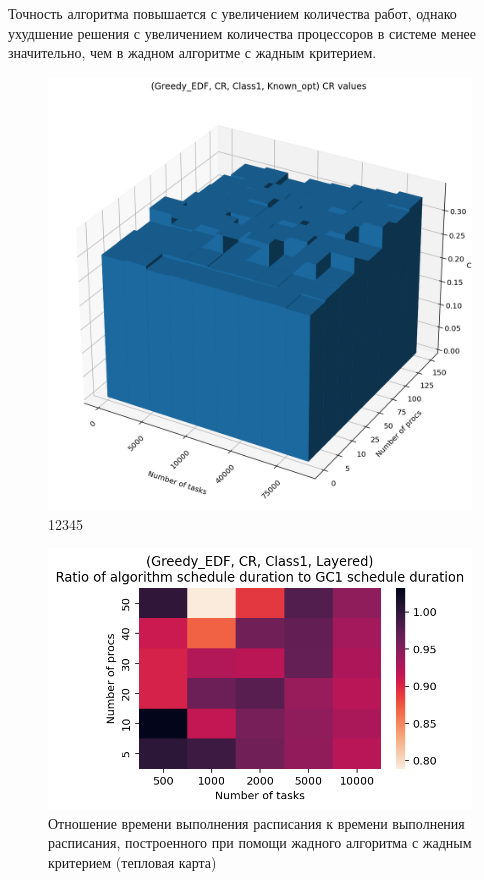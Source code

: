 Точность алгоритма повышается с увеличением количества работ, однако ухудшение решения с увеличением количества процессоров в системе менее значительно, чем в жадном алгоритме с жадным критерием. 

\begin{figure}[!htbp]
    \centering
    \includegraphics[width=\textwidth]{imgs/ideal_1/CR_EDF/cr_3d.png}
    \caption{12345}
\end{figure}

\begin{figure}
    \centering
    \includegraphics[width=\textwidth]{imgs/layered_class_1/CR_EDF/times.png}
    \caption{Отношение времени выполнения расписания к времени выполнения расписания, построенного при помощи жадного алгоритма с жадным критерием (тепловая карта)}
    \label{fig:CR-layered-EDF-times-heatmap}
\end{figure}

